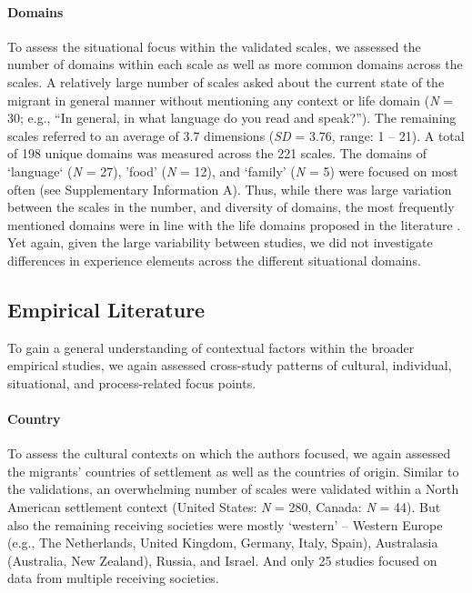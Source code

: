 \paragraph{Domains}

To assess the situational focus within the validated scales, we assessed
the number of domains within each scale as well as more common domains
across the scales. A relatively large number of scales asked about the
current state of the migrant in general manner without mentioning any
context or life domain (\textit{N} = 30; e.g., ``In general, in what
language do you read and speak?''). The remaining scales referred to an
average of 3.7 dimensions (\textit{SD} = 3.76, range: 1 -- 21). A total
of 198 unique domains was measured across the 221 scales. The domains of
`language` (\textit{N} = 27), 'food' (\textit{N} = 12), and `family'
(\textit{N} = 5) were focused on most often (see Supplementary
Information A). Thus, while there was large variation between the scales
in the number, and diversity of domains, the most frequently mentioned
domains were in line with the life domains proposed in the literature
\citep[e.g.,][]{Arends-Toth2007}. Yet again, given the large variability
between studies, we did not investigate differences in experience
elements across the different situational domains.

\subsection{Empirical Literature}

To gain a general understanding of contextual factors within the broader
empirical studies, we again assessed cross-study patterns of cultural,
individual, situational, and process-related focus points.

\paragraph{Country}

To assess the cultural contexts on which the authors focused, we again
assessed the migrants' countries of settlement as well as the countries
of origin. Similar to the validations, an overwhelming number of scales
were validated within a North American settlement context (United
States: \textit{N} = 280, Canada: \textit{N} = 44). But also the
remaining receiving societies were mostly `western' -- Western Europe
(e.g., The Netherlands, United Kingdom, Germany, Italy, Spain),
Australasia (Australia, New Zealand), Russia, and Israel. And only 25
studies focused on data from multiple receiving societies.

